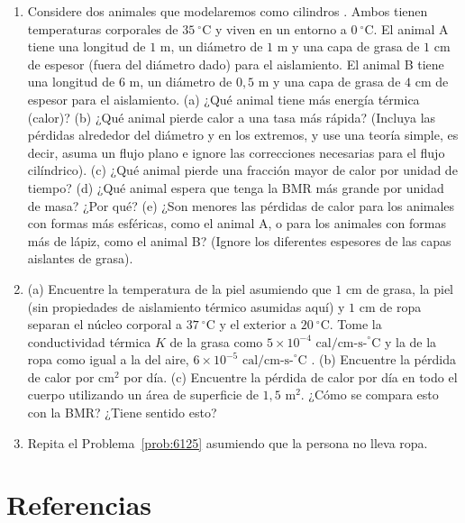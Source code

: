 \documentclass[12pt]{book}
\begin{document}
\begin{enumerate}
\item[6.124] Considere dos animales que modelaremos como cilindros \cite{69}. Ambos tienen temperaturas corporales de $35\ ^\circ\text{C}$ y viven en un entorno a $0\ ^\circ\text{C}$. El animal A tiene una longitud de $1\text{ m}$, un diámetro de $1\text{ m}$ y una capa de grasa de $1\text{ cm}$ de espesor (fuera del diámetro dado) para el aislamiento. El animal B tiene una longitud de $6\text{ m}$, un diámetro de $0{,}5\text{ m}$ y una capa de grasa de $4\text{ cm}$ de espesor para el aislamiento. (a) ¿Qué animal tiene más energía térmica (calor)? (b) ¿Qué animal pierde calor a una tasa más rápida? (Incluya las pérdidas alrededor del diámetro y en los extremos, y use una teoría simple, es decir, asuma un flujo plano e ignore las correcciones necesarias para el flujo cilíndrico). (c) ¿Qué animal pierde una fracción mayor de calor por unidad de tiempo? (d) ¿Qué animal espera que tenga la BMR más grande por unidad de masa? ¿Por qué? (e) ¿Son menores las pérdidas de calor para los animales con formas más esféricas, como el animal A, o para los animales con formas más de lápiz, como el animal B? (Ignore los diferentes espesores de las capas aislantes de grasa).

\item[6.125] \label{prob:6125} (a) Encuentre la temperatura de la piel asumiendo que $1\text{ cm}$ de grasa, la piel (sin propiedades de aislamiento térmico asumidas aquí) y $1\text{ cm}$ de ropa separan el núcleo corporal a $37\ ^\circ\text{C}$ y el exterior a $20\ ^\circ\text{C}$. Tome la conductividad térmica $K$ de la grasa como $5 \times 10^{-4}\text{ cal/cm-s-}^\circ\text{C}$ y la de la ropa como igual a la del aire, $6 \times 10^{-5}\text{ cal/cm-s-}^\circ\text{C}$ \cite{69}. (b) Encuentre la pérdida de calor por $\text{cm}^2$ por día. (c) Encuentre la pérdida de calor por día en todo el cuerpo utilizando un área de superficie de $1{,}5\text{ m}^2$. ¿Cómo se compara esto con la BMR? ¿Tiene sentido esto?

\item[6.126] Repita el Problema~\ref{prob:6125} asumiendo que la persona no lleva ropa.

\end{enumerate}

\section*{Referencias}
\end{document}
